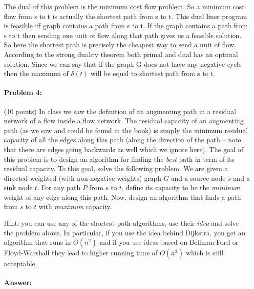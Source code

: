 The dual of this problem is the minimum cost flow problem. So a minimum cost flow from s to t is actually the shortest path from s to t. This  dual liner program is feasible iff graph contains a path from s to t. If the graph contains a path from s to t then sending one unit of flow along that path gives us a feasible solution. So here the shortest path is precisely the cheapest way to send a unit of flow.\\
According to the strong duality theorem both primal and dual has an optimal solution. Since we can say that if the graph G does not have any negative cycle then the maximum of $\delta(t)$ will be equal to shortest path from s to t. 
\newpage
\paragraph{Problem 4:} (10 points)  
In class we saw the definition of an augmenting path in a residual network of a flow inside a flow network. The residual capacity of an augmenting path (as we saw and could be found in the book) is simply the minimum residual capacity of all the edges along this path (along the direction of the path -- note that there are edges going backwards as well which we ignore here). The goal of this problem is to design an algorithm for finding the \emph{best} path in term of its residual capacity. To this goal, solve the following problem.
We are given a directed weighted (with non-negative weights) graph $G$ and a source node $s$ and a sink node $t$. For any path $P$ from $s$ to $t$, define its capacity to be the \emph{minimum} weight of any edge along this path. Now, design an algorithm that finds a path from $s$ to $t$ with \emph{maximum} capacity.

Hint: you can use any of the shortest path algorithms, use their \emph{idea} and solve the problem above. In particular, if you use the idea behind Dijkstra, you get an algorithm that runs in $O(n^2)$ and if you use ideas based on Bellman-Ford or Floyd-Warshall they lead to higher running time of $O(n^3)$ which is still acceptable.

\paragraph{Answer:}

